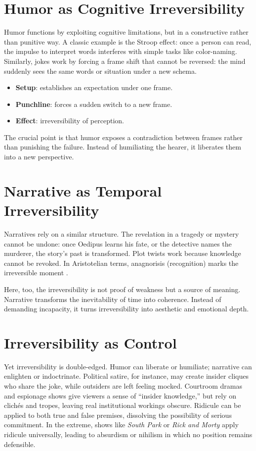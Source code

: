 \documentclass[openany]{book}
\begin{document}
\section{Humor as Cognitive Irreversibility}

Humor functions by exploiting cognitive limitations, but in a constructive rather than punitive way. A classic example is the Stroop effect: once a person can read, the impulse to interpret words interferes with simple tasks like color-naming. Similarly, jokes work by forcing a frame shift that cannot be reversed: the mind suddenly sees the same words or situation under a new schema.

\begin{itemize}
    \item \textbf{Setup}: establishes an expectation under one frame.
    \item \textbf{Punchline}: forces a sudden switch to a new frame.
    \item \textbf{Effect}: irreversibility of perception.
\end{itemize}

The crucial point is that humor exposes a contradiction between frames rather than punishing the failure. Instead of humiliating the hearer, it liberates them into a new perspective.

\section{Narrative as Temporal Irreversibility}

Narratives rely on a similar structure. The revelation in a tragedy or mystery cannot be undone: once Oedipus learns his fate, or the detective names the murderer, the story’s past is transformed. Plot twists work because knowledge cannot be revoked. In Aristotelian terms, anagnorisis (recognition) marks the irreversible moment \cite{ortega1935}.

Here, too, the irreversibility is not proof of weakness but a source of meaning. Narrative transforms the inevitability of time into coherence. Instead of demanding incapacity, it turns irreversibility into aesthetic and emotional depth.

\section{Irreversibility as Control}

Yet irreversibility is double-edged. Humor can liberate or humiliate; narrative can enlighten or indoctrinate. Political satire, for instance, may create insider cliques who share the joke, while outsiders are left feeling mocked. Courtroom dramas and espionage shows give viewers a sense of ``insider knowledge,'' but rely on clichés and tropes, leaving real institutional workings obscure. Ridicule can be applied to both true and false premises, dissolving the possibility of serious commitment. In the extreme, shows like \textit{South Park} or \textit{Rick and Morty} apply ridicule universally, leading to absurdism or nihilism in which no position remains defensible.
\end{document}
